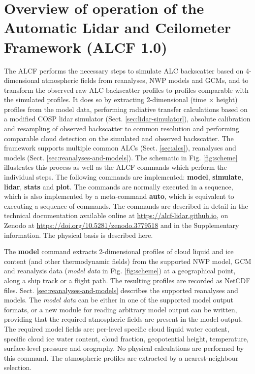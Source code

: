 \section{Overview of operation of the Automatic Lidar and Ceilometer Framework (ALCF 1.0)}
\label{sec:alcf}

The ALCF performs the necessary
steps to simulate ALC backscatter based on 4-dimensional atmospheric fields
from reanalyses, NWP models and GCMs, and to transform the observed raw ALC
backscatter profiles to profiles comparable with the simulated profiles.
It does so by extracting 2-dimensional (time $\times$ height) profiles from the
model data, performing radiative transfer calculations based on a modified COSP
lidar simulator (Sect. \ref{sec:lidar-simulator}),
absolute calibration and resampling of observed backscatter
to common resolution and performing comparable cloud detection on the simulated
and observed backscatter.
The framework
supports multiple common ALCs (Sect. \ref{sec:alcs}), reanalyses and models
(Sect. \ref{sec:reanalyses-and-models}).
The schematic in Fig. \ref{fig:scheme} illustrates this process
as well as the ALCF commands which perform the individual steps.
The following commands are implemented: \textbf{model}, \textbf{simulate},
\textbf{lidar}, \textbf{stats} and \textbf{plot}. The commands are normally
executed in a sequence, which is also implemented by a meta-command \textbf{auto},
which is equivalent to executing a sequence of commands. The commands are
described in detail in the technical documentation available online at
\url{https://alcf-lidar.github.io}, on Zenodo at \url{https://doi.org/10.5281/zenodo.3779518}
and in the Supplementary information. The physical basis is described here.

The \textbf{model}
command extracts 2-dimensional profiles of cloud liquid and ice content
(and other thermodynamic fields) from the supported NWP model, GCM and
reanalysis data (\textit{model data} in Fig. \ref{fig:scheme}) at a geographical point, along a ship track or a flight path.
The resulting profiles are recorded as NetCDF files. Sect. \ref{sec:reanalyses-and-models}
describes the supported reanalyses and models. The \textit{model data} can
be either in one of the supported model output formats,
or a new module for reading arbitrary model output can be written,
providing that the required atmospheric fields are present in the model output.
The required model fields are: per-level specific cloud liquid water content,
specific cloud ice water content, cloud fraction, geopotential height, temperature,
surface-level pressure and orography. No physical calculations are performed
by this command. The atmospheric profiles are extracted by a nearest-neighbour
selection.

